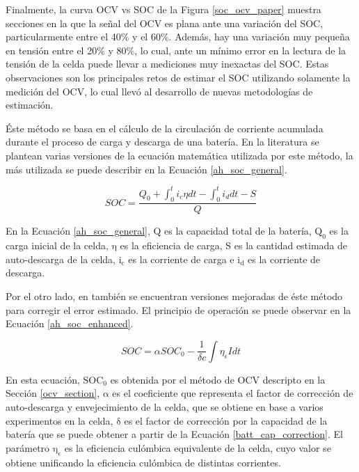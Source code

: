 \documentclass[10pt,a4paper]{article}
\newcounter{subsubsubsection}[subsubsection]
\begin{document}
\noindent Finalmente, la curva \acrshort{OCV} vs \acrshort{SOC} de la Figura
\ref{soc_ocv_paper} muestra secciones en la que la señal del \acrshort{OCV} es
plana ante una variaci\'on del \acrshort{SOC}, particularmente entre el 40\% y
el 60\%. Adem\'as, hay una variaci\'on muy pequeña en tensi\'on entre el 20\% y
80\%, lo cual, ante un m\'inimo error en la lectura de la tensi\'on de la celda
puede llevar a mediciones muy inexactas del \acrshort{SOC}. Estas observaciones
son los principales retos de estimar el \acrshort{SOC} utilizando solamente la
medici\'on del \acrshort{OCV}, lo cual llev\'o al desarrollo de nuevas
metodolog\'ias de estimaci\'on.

\newpage

\label{ahMethod}

\noindent \'Este m\'etodo se basa en el c\'alculo de la circulaci\'on de 
corriente acumulada durante el proceso de carga y descarga de una bater\'ia. En 
la literatura se plantean varias versiones de la ecuaci\'on matem\'atica
utilizada por este m\'etodo, la m\'as utilizada se puede describir en la 
Ecuaci\'on \ref{ah_soc_general}.

\begin{equation}
    SOC = \frac{Q_0 + \int_{0}^t i_c\eta dt - \int_{0}^t i_d dt - S}{Q}
    \label{ah_soc_general}
\end{equation}

\noindent En la Ecuaci\'on \ref{ah_soc_general}, Q es la capacidad total de la 
bater\'ia, $\mathrm{Q_0}$ es la carga inicial de la celda, $\mathrm{\eta}$ es la 
eficiencia de carga, S es la cantidad estimada de auto-descarga de la celda, 
$\mathrm{i_c}$ es la corriente de carga e $\mathrm{i_d}$ es la corriente de 
descarga.

\noindent Por el otro lado, en \cite{ZHANG201524} tambi\'en se encuentran 
versiones mejoradas de \'este m\'etodo para corregir el error estimado. 
El principio de operaci\'on se puede observar en la Ecuaci\'on 
\ref{ah_soc_enhanced}.

\begin{equation}
    SOC = \alpha SOC_0 - \frac{1}{\delta c}\int \eta_\epsilon I dt
    \label{ah_soc_enhanced}
\end{equation}

En esta ecuaci\'on, $\mathrm{SOC_0}$ es obtenida por el m\'etodo de
\acrshort{OCV} descripto en la Secci\'on \ref{ocv_section}, $\mathrm{\alpha}$ es
el coeficiente que representa el factor de correcci\'on de auto-descarga y
envejecimiento de la celda, que se obtiene en base a varios experimentos en la
celda, $\mathrm{\delta}$ es el factor de correcci\'on por la capacidad de la
bater\'ia que se puede obtener a partir de la Ecuaci\'on
\ref{batt_cap_correction}. El par\'ametro $\mathrm{\eta_\epsilon}$ es la
eficiencia cul\'ombica equivalente de la celda, cuyo valor se obtiene unificando
la eficiencia cul\'ombica de distintas corrientes.
\end{document}
